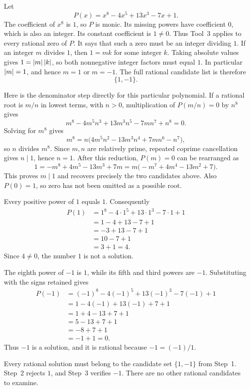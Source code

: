 Let
\[
 P(x)=x^8-4x^5+13x^3-7x+1.
\]
The coefficient of $x^8$ is $1$, so $P$ is monic. Its missing powers
have coefficient $0$, which is also an integer. Its constant coefficient
is $1\ne0$. Thus Tool~3 applies to every rational zero of $P$.
It says that such a zero must be an integer dividing $1$. If an integer
$m$ divides $1$, then $1=mk$ for some integer $k$. Taking absolute
values gives $1=\left|m\right|\left|k\right|$, so both nonnegative integer factors
must equal $1$. In particular $\left|m\right|=1$, and hence $m=1$ or $m=-1$.
The full rational candidate list is therefore
\[
 \{1,-1\}.
\]

Here is the denominator step directly for this particular polynomial.
If a rational root is $m/n$ in lowest terms, with $n>0$, multiplication
of $P(m/n)=0$ by $n^8$ gives
\[
 m^8-4m^5n^3+13m^3n^5-7mn^7+n^8=0.
\]
Solving for $m^8$ gives
\[
 m^8=n\bigl(4m^5n^2-13m^3n^4+7mn^6-n^7\bigr),
\]
so $n$ divides $m^8$. Since $m,n$ are relatively prime, repeated
coprime cancellation gives $n\mid1$, hence $n=1$.
After this reduction, $P(m)=0$ can be rearranged as
\[
 1=-m^8+4m^5-13m^3+7m
   =m\bigl(-m^7+4m^4-13m^2+7\bigr).
\]
This proves $m\mid1$ and recovers precisely the two candidates above.
Also $P(0)=1$, so zero has not been omitted as a possible root.

Every positive power of $1$ equals $1$. Consequently
\begin{align*}
 P(1)
 &=1^8-4\cdot1^5+13\cdot1^3-7\cdot1+1\\
 &=1-4+13-7+1\\
 &=-3+13-7+1\\
 &=10-7+1\\
 &=3+1=4.
\end{align*}
Since $4\ne0$, the number $1$ is not a solution.

The eighth power of $-1$ is $1$, while its fifth and third powers
are $-1$. Substituting with the signs retained gives
\begin{align*}
 P(-1)
 &=(-1)^8-4(-1)^5+13(-1)^3-7(-1)+1\\
 &=1-4(-1)+13(-1)+7+1\\
 &=1+4-13+7+1\\
 &=5-13+7+1\\
 &=-8+7+1\\
 &=-1+1=0.
\end{align*}
Thus $-1$ is a solution, and it is rational because $-1=(-1)/1$.

Every rational solution must belong to the candidate set $\{1,-1\}$
from Step~1. Step~2 rejects $1$, and Step~3 verifies $-1$. There are
no other rational candidates to examine.

